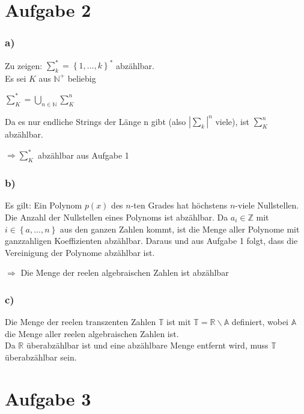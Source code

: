 \documentclass[a4paper,12pt]{article}
\begin{document}
	\section*{Aufgabe 2}
	\subsubsection*{a)}
	Zu zeigen: $\sum_{k}^{*} = \left\lbrace 1, ..., k\right\rbrace^*$ abzählbar.\\
	
	Es sei $K$ aus $\mathbb{N}^+$ beliebig
	\begin{center}
		$\sum_{K}^{*} = \bigcup\limits_{n \in \mathbb{N}} \sum_{K}^{n}$
	\end{center}
	Da es nur endliche Strings der Länge n gibt (also $|\sum_{k}|^n$ viele), ist $\sum_{K}^{n}$ abzählbar.
	\begin{center}
		$\Rightarrow \sum_{K}^{*}$ abzählbar aus Aufgabe 1
	\end{center}

	\subsubsection*{b)}
	Es gilt: Ein Polynom $p\left( x\right)$ des $n$-ten Grades hat höchstens $n$-viele Nullstellen. Die Anzahl der Nullstellen eines Polynoms ist abzählbar. Da $a_i \in \mathbb{Z}$ mit $i \in \left\lbrace a, ..., n\right\rbrace$ aus den ganzen Zahlen kommt, ist die Menge aller Polynome mit ganzzahligen Koeffizienten abzählbar. Daraus und aus Aufgabe 1 folgt, dass die Vereinigung der Polynome abzählbar ist.
	\begin{center}
		$\Rightarrow$ Die Menge der reelen algebraischen Zahlen ist abzählbar
	\end{center}

	\subsubsection*{c)}
	Die Menge der reelen transzenten Zahlen $\mathbb{T}$ ist mit $\mathbb{T} = \mathbb{R} \backslash \mathbb{A}$ definiert, wobei $\mathbb{A}$ die Menge aller reelen algebraischen Zahlen ist.\\
	Da $\mathbb{R}$ überabzählbar ist und eine abzählbare Menge entfernt wird, muss $\mathbb{T}$ überabzählbar sein.

	\section*{Aufgabe 3}
\end{document}
